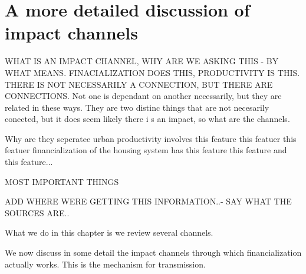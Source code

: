  






\section{A more detailed  discussion of impact channels}

WHAT IS AN IMPACT CHANNEL, WHY ARE WE ASKING THIS - BY WHAT MEANS. FINACIALIZATION DOES THIS, PRODUCTIVITY IS THIS. THERE IS NOT NECESSARILY A CONNECTION, BUT THERE ARE CONNECTIONS. 
Not one is dependant on another necessarily, but they are related in these ways.
They are two distinc things that are not necesarily conected, but it does seem likely there i s an impact, so what are the channels. 

Why are they seperatee 
urban productivity involves this feature this featuer this featuer
financialization of the housing system has this feature this feature and this feature...

MOST IMPORTANT THINGS

ADD WHERE WERE GETTING THIS INFORMATION..- SAY WHAT THE SOURCES ARE..


What we do in this chapter is we review several channels.

We now discuss in some detail the impact channels through which financialization actually works. This is the mechanism for transmission.

